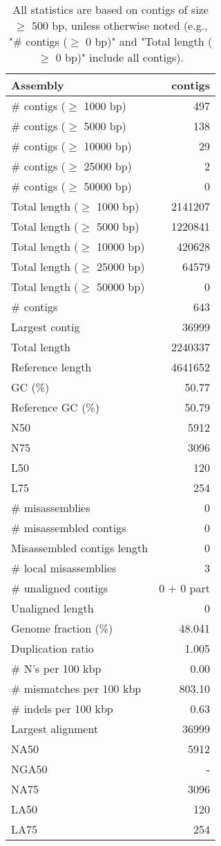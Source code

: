 \documentclass[12pt,a4paper]{article}
\begin{document}
\begin{table}[ht]
\begin{center}
\caption{All statistics are based on contigs of size $\geq$ 500 bp, unless otherwise noted (e.g., "\# contigs ($\geq$ 0 bp)" and "Total length ($\geq$ 0 bp)" include all contigs).}
\begin{tabular}{|l*{1}{|r}|}
\hline
Assembly & contigs \\ \hline
\# contigs ($\geq$ 1000 bp) & 497 \\ \hline
\# contigs ($\geq$ 5000 bp) & 138 \\ \hline
\# contigs ($\geq$ 10000 bp) & 29 \\ \hline
\# contigs ($\geq$ 25000 bp) & 2 \\ \hline
\# contigs ($\geq$ 50000 bp) & 0 \\ \hline
Total length ($\geq$ 1000 bp) & 2141207 \\ \hline
Total length ($\geq$ 5000 bp) & 1220841 \\ \hline
Total length ($\geq$ 10000 bp) & 420628 \\ \hline
Total length ($\geq$ 25000 bp) & 64579 \\ \hline
Total length ($\geq$ 50000 bp) & 0 \\ \hline
\# contigs & 643 \\ \hline
Largest contig & 36999 \\ \hline
Total length & 2240337 \\ \hline
Reference length & 4641652 \\ \hline
GC (\%) & 50.77 \\ \hline
Reference GC (\%) & 50.79 \\ \hline
N50 & 5912 \\ \hline
N75 & 3096 \\ \hline
L50 & 120 \\ \hline
L75 & 254 \\ \hline
\# misassemblies & 0 \\ \hline
\# misassembled contigs & 0 \\ \hline
Misassembled contigs length & 0 \\ \hline
\# local misassemblies & 3 \\ \hline
\# unaligned contigs & 0 + 0 part \\ \hline
Unaligned length & 0 \\ \hline
Genome fraction (\%) & 48.041 \\ \hline
Duplication ratio & 1.005 \\ \hline
\# N's per 100 kbp & 0.00 \\ \hline
\# mismatches per 100 kbp & 803.10 \\ \hline
\# indels per 100 kbp & 0.63 \\ \hline
Largest alignment & 36999 \\ \hline
NA50 & 5912 \\ \hline
NGA50 & - \\ \hline
NA75 & 3096 \\ \hline
LA50 & 120 \\ \hline
LA75 & 254 \\ \hline
\end{tabular}
\end{center}
\end{table}
\end{document}
